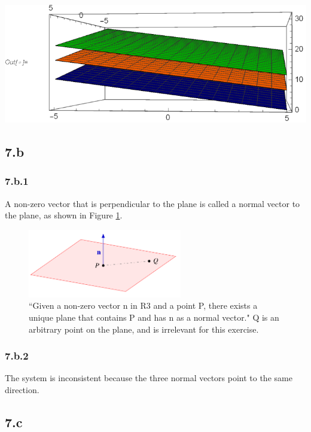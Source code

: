 \documentclass[11pt,a4paper]{article}
\begin{document}
\includegraphics{MathematicaP1_gr2.eps}

\subsection*{7.b}

\subsubsection*{7.b.1}
 A non-zero vector that is perpendicular to the plane is called a normal vector to the plane, as shown in Figure \ref{img:01}. \parencite{Kuttler}

\begin{figure}[!htb]
\centering
\includegraphics[width=0.60\textwidth]{normalv.png}
\caption{``Given a non-zero vector n in R3 and a point P, there exists a unique plane that contains P and has n as a normal vector." \parencite{Kuttler} Q is an arbitrary point on the plane, and is irrelevant for this exercise. \label{img:01}}
\end{figure}

\subsubsection*{7.b.2}
The system is inconsistent because the three normal vectors point to the same direction.\\

\subsection*{7.c}
\end{document}
